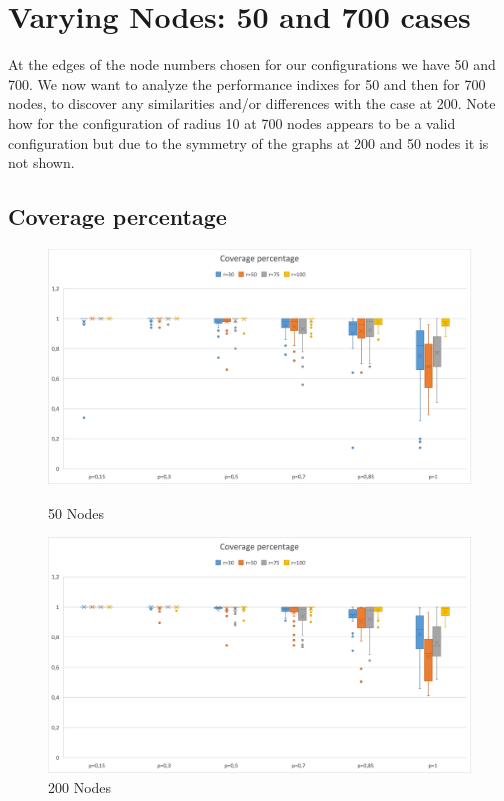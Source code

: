 \section{Varying Nodes: 50 and 700 cases}
At the edges of the node numbers chosen for our configurations we have 50 and 700. We now want to analyze the performance indixes for 50 and then for 700 nodes, to discover any similarities and/or differences with the case at 200. Note how for the configuration of radius 10 at 700 nodes appears to be a valid configuration but due to the symmetry of the graphs at 200 and 50 nodes it is not shown.

\subsection{Coverage percentage}
\begin{figure}[H]
  \includegraphics[width=\linewidth]{./images/Rate50Boxplot.png}
  \caption{50 Nodes}\label{fig:awesome_image1}
\endminipage\hfill
{}
  \includegraphics[width=\linewidth]{./images/Rate200Boxplot.png}
  \caption{200 Nodes}\label{fig:awesome_image2}
\endminipage
\end{figure}

